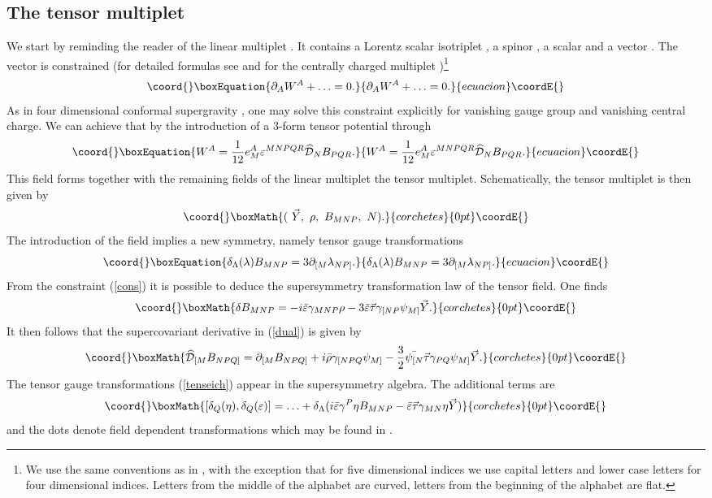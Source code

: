 \documentclass[a4paper,12pt, twoside]{article}
\numberwithin{equation}{section}
\begin{document}
\subsection{The tensor multiplet}\label{tenm}
We start by reminding the reader of the linear multiplet 
\cite{Zucker:1999fn}. It contains a Lorentz scalar isotriplet \coordHE{}, a spinor 
\myHighlight{$\rho$}\coordHE{}, a scalar \coordHE{} and a vector \coordHE{}. The vector \coordHE{} is constrained 
(for detailed formulas see \cite{Zucker:1999fn} and for the centrally 
charged multiplet \cite{diss})\footnote{We use the same conventions as in 
\cite{Zucker:2000ej}, with the exception that for five dimensional 
indices we use capital letters and lower case letters for four dimensional 
indices. Letters from the middle of the alphabet are curved, letters 
from the beginning of the alphabet are flat.} 
\begin{equation}\coord{}\boxEquation{
\partial_A W^A+\ldots=0.\label{cons}
}{
\partial_A W^A+\ldots=0.}{ecuacion}\coordE{}\end{equation}
As in four dimensional conformal supergravity \cite{deWit:1983na}, one 
may solve this constraint explicitly for vanishing gauge group and 
vanishing central charge. We can achieve that by  the introduction of a 
3-form tensor potential through
\begin{equation}\coord{}\boxEquation{
W^A = \frac{1}{12}e_M^A\varepsilon^{MNPQR}\widehat{\cal D}_N 
B_{PQR}\label{dual}.
}{
W^A = \frac{1}{12}e_M^A\varepsilon^{MNPQR}\widehat{\cal D}_N 
B_{PQR}.
}{ecuacion}\coordE{}\end{equation}
This field forms together with the remaining fields of the linear 
multiplet the tensor multiplet. Schematically, the tensor multiplet is then 
given by
\[\coord{}\boxMath{
(~\vec{Y},~\rho,~ B_{MNP},~ N).
}{corchetes}{0pt}\coordE{}\]
The introduction of the field \coordHE{} implies a new symmetry, namely 
tensor gauge transformations
\begin{equation}\coord{}\boxEquation{
\delta_\Lambda(\lambda)B_{MNP}=3\partial_{[M}\lambda_{NP]}.\label{tenseich} 
}{
\delta_\Lambda(\lambda)B_{MNP}=3\partial_{[M}\lambda_{NP]}.}{ecuacion}\coordE{}\end{equation}
From the constraint (\ref{cons}) it is possible to deduce the 
supersymmetry transformation law of the tensor field. One finds
\[\coord{}\boxMath{
\delta B_{MNP} = 
-i\bar{\varepsilon}\gamma_{MNP}\rho-3\bar{\varepsilon}\vec{\tau}\gamma_{[NP}\psi_{M]}\vec{Y}.
}{corchetes}{0pt}\coordE{}\]
It then follows that the supercovariant derivative in (\ref{dual}) is 
given by 
\[\coord{}\boxMath{
\widehat{\cal D}_{[M} B_{NPQ]} = \partial_{[M} 
B_{NPQ]}+i\bar{\rho}\gamma_{[NPQ}\psi_{M]}-\frac{3}{2}\bar{\psi_{[N}}\vec{\tau}\gamma_{PQ}\psi_{M]}\vec{Y}.
}{corchetes}{0pt}\coordE{}\]
The tensor gauge transformations (\ref{tenseich}) appear in the 
supersymmetry algebra. The additional terms are
\[\coord{}\boxMath{
[\delta_Q(\eta),\delta_Q(\varepsilon)]=\ldots + 
\delta_\Lambda(i\bar{\varepsilon}\gamma^P\eta 
B_{MNP}-\bar{\varepsilon}\vec{\tau}\gamma_{MN}\eta\vec{Y})
}{corchetes}{0pt}\coordE{}\]
and the dots denote field dependent transformations which may be found 
in \cite{Zucker:2000ej}.
\end{document}
